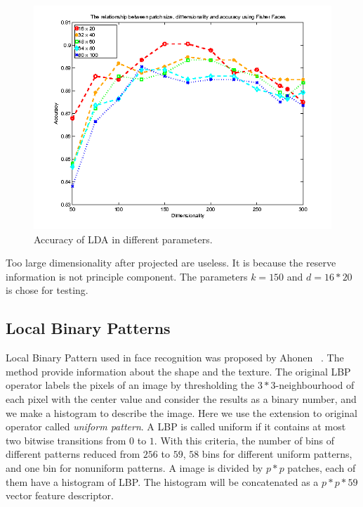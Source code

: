\documentclass[10pt,twocolumn,letterpaper]{article}
\begin{document}
\begin{figure}[t]
    \begin{center}
        \includegraphics[width=0.8\linewidth]{fig/lda/lda_par.png}
    \end{center}
    \caption{Accuracy of LDA in different parameters.}
    \label{fig:lda_par}
\end{figure}

Too large dimensionality after projected are useless. It is because the reserve information
is not principle component. The parameters $k=150$ and $d=16*20$ is chose for testing.


\subsection{Local Binary Patterns}
Local Binary Pattern used in face recognition was proposed by 
Ahonen \etal~\cite{Ahonen2004}. The method provide information about the
shape and the texture. The original LBP operator labels the pixels of an
image by thresholding the $3*3$-neighbourhood of each pixel with the center
value and consider the results as a binary number, and we make a histogram
to describe the image. Here we use the extension to original operator called
{\it uniform pattern}. A LBP is called uniform if it contains
at most two bitwise transitions from $0$ to $1$. With this criteria, 
the number of bins of different patterns reduced from $256$ to $59$,
$58$ bins for different uniform patterns, and one bin for nonuniform patterns.
A image is divided by $p*p$ patches, each of them have a histogram of LBP.
The histogram will be concatenated as a $p*p*59$ vector feature descriptor.
\end{document}
